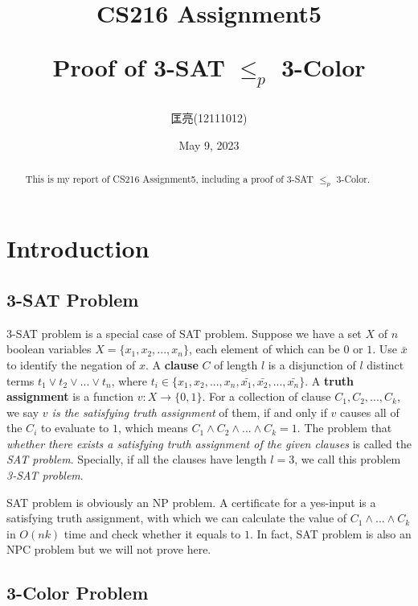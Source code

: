 \documentclass{article}
\title{CS216 Assignment5 \\ {\begin{large} Proof of 3-SAT $\leq_p$ 3-Color \end{large}}}  %
\author{匡亮(12111012)}
\date{May 9, 2023}  %
\begin{document}
\maketitle

\renewcommand\abstractname{Abstract}
\begin{abstract}

This is my report of CS216 Assignment5, including a proof of 3-SAT $\leq_p$ 3-Color.

\end{abstract}

\newpage %

\renewcommand\contentsname{Contents}
\tableofcontents

\newpage  %

\section{Introduction}

\subsection{3-SAT Problem}

3-SAT problem is a special case of SAT problem. Suppose we have a set $X$ of $n$ boolean variables $X=\{x_1,x_2,...,x_n\}$, each element of which can be $0$ or $1$. Use $\bar{x}$ to identify the negation of $x$. A \textbf{clause} $C$ of length $l$ is a disjunction of $l$ distinct terms $t_1\lor t_2\lor ...\lor t_n$, where $t_i\in\{x_1,x_2,...,x_n,\bar{x_1},\bar{x_2},...,\bar{x_n}\}$. A \textbf{truth assignment} is a function $v:X\to\{0,1\}$. For a collection of clause $C_1,C_2,...,C_k$, we say \textit{$v$ is the satisfying truth assignment} of them, if and only if $v$ causes all of the $C_i$ to evaluate to $1$, which means $C_1\land C_2\land ...\land C_k=1$. The problem that \textit{whether there exists a satisfying truth assignment of the given clauses} is called the \textit{SAT problem}. Specially, if all the clauses have length $l=3$, we call this problem \textit{3-SAT problem}.

SAT problem is obviously an NP problem. A certificate for a yes-input is a satisfying truth assignment, with which we can calculate the value of $C_1\land ...\land C_k$ in $O(nk)$ time and check whether it equals to $1$. In fact, SAT problem is also an NPC problem but we will not prove here.

\subsection{3-Color Problem}
\end{document}
